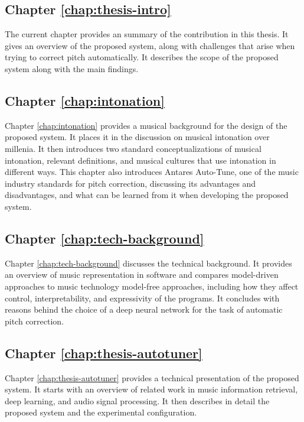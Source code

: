\subsection{Chapter \ref{chap:thesis-intro}}
The current chapter provides an summary of the contribution in this thesis. It gives an overview of the proposed system, along with challenges that arise when trying to correct pitch automatically. It describes the scope of the proposed system along with the main findings. 

\subsection{Chapter \ref{chap:intonation}}
Chapter \ref{chap:intonation} provides a musical background for the design of the proposed system. It places it in the discussion on musical intonation over millenia. It then introduces two standard conceptualizations of musical intonation, relevant definitions, and musical cultures that use intonation in different ways. This chapter also introduces Antares Auto-Tune, one of the music industry standards for pitch correction, discussing its advantages and disadvantages, and what can be learned from it when developing the proposed system.

\subsection{Chapter \ref{chap:tech-background}}
Chapter \ref{chap:tech-background} discusses the technical background. It provides an overview of music representation in software and compares model-driven approaches to music technology model-free approaches,  including how they affect control, interpretability, and expressivity of the programs. It concludes with reasons behind the choice of a deep neural network for the task of automatic pitch correction.

\subsection{Chapter \ref{chap:thesis-autotuner}}
Chapter \ref{chap:thesis-autotuner} provides a technical presentation of the proposed system. It starts with an overview of related work in music information retrieval, deep learning, and audio signal processing. It then describes in detail the proposed system and the experimental configuration.

